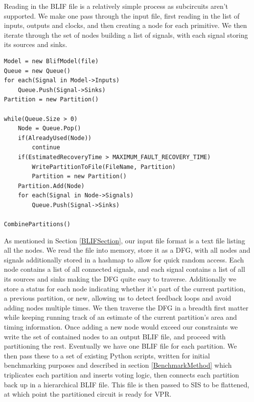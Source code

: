 \documentclass[12pt,final,oneside]{memoir} %
\begin{document}
Reading in the \ac{BLIF} file is a relatively simple process as subcircuits aren't supported. We make one pass through the input file, first reading in the list of inputs, outputs and clocks, and then creating a node for each primitive. We then iterate through the set of nodes building a list of signals, with each signal storing its sources and sinks.

\begin{lstlisting}[caption=Simplified Pseudocode,label=Pseudocode]
Model = new BlifModel(file)
Queue = new Queue()
for each(Signal in Model->Inputs)
    Queue.Push(Signal->Sinks)
Partition = new Partition()

while(Queue.Size > 0)
    Node = Queue.Pop()
    if(AlreadyUsed(Node))
        continue
    if(EstimatedRecoveryTime > MAXIMUM_FAULT_RECOVERY_TIME)
        WritePartitionToFile(FileName, Partition)
        Partition = new Partition()
    Partition.Add(Node)
    for each(Signal in Node->Signals)
        Queue.Push(Signal->Sinks)

CombinePartitions()
\end{lstlisting}

As mentioned in Section \ref{BLIFSection}, our input file format is a text file listing all the nodes. We read the file into memory, store it as a \ac{DFG}, with all nodes and signals additionally stored in a hashmap to allow for quick random access. Each node contains a list of all connected signals, and each signal contains a list of all its sources and sinks making the \ac{DFG} quite easy to traverse. Additionally we store a status for each node indicating whether it's part of the current partition, a previous partition, or new, allowing us to detect feedback loops and avoid adding nodes multiple times.
We then traverse the \ac{DFG} in a breadth first matter while keeping running track of an estimate of the current partition's area and timing information. Once adding a new node would exceed our constraints we write the set of contained nodes to an output \ac{BLIF} file, and proceed with partitioning the rest. Eventually we have one \ac{BLIF} file for each partition. We then pass these to a set of existing Python scripts, written for initial benchmarking purposes and described in section \ref{BenchmarkMethod} which triplicates each partition and inserts voting logic, then connects each partition back up in a hierarchical \ac{BLIF} file. This file is then passed to \ac{SIS} to be flattened, at which point the partitioned circuit is ready for \ac{VPR}.
\end{document}
